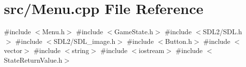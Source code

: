 \section{src/\+Menu.cpp File Reference}
\label{_menu_8cpp}
{\ttfamily \#include $<$Menu.\+h$>$}\newline
{\ttfamily \#include $<$Game\+State.\+h$>$}\newline
{\ttfamily \#include $<$S\+D\+L2/\+S\+D\+L.\+h$>$}\newline
{\ttfamily \#include $<$S\+D\+L2/\+S\+D\+L\+\_\+image.\+h$>$}\newline
{\ttfamily \#include $<$Button.\+h$>$}\newline
{\ttfamily \#include $<$vector$>$}\newline
{\ttfamily \#include $<$string$>$}\newline
{\ttfamily \#include $<$iostream$>$}\newline
{\ttfamily \#include $<$State\+Return\+Value.\+h$>$}\newline
